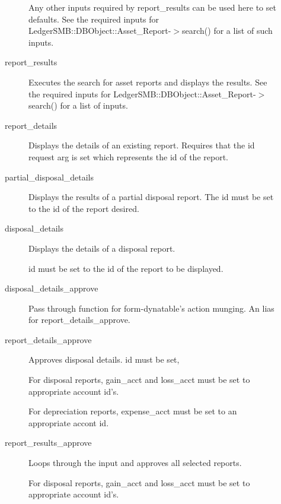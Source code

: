 \begin{description}
\begin{description}
Any other inputs required by
report\_results can be used here to set defaults.  See the required inputs for
LedgerSMB::DBObject::Asset\_Report-$>$search() for a list of such inputs.


\item[{report\_results}] \mbox{}

Executes the search for asset reports and displays the results.  See the 
required inputs for LedgerSMB::DBObject::Asset\_Report-$>$search() for a list of 
inputs.


\item[{report\_details}] \mbox{}

Displays the details of an existing report.  Requires that the id request arg is
set which represents the id of the report.


\item[{partial\_disposal\_details}] \mbox{}

Displays the results of a partial disposal report.  The id must be set to the 
id of the report desired.


\item[{disposal\_details}] \mbox{}

Displays the details of a disposal report.



id must be set to the id of the report to be displayed.


\item[{disposal\_details\_approve}] \mbox{}

Pass through function for form-dynatable's action munging.  An lias for 
report\_details\_approve.


\item[{report\_details\_approve}] \mbox{}

Approves disposal details.  id must be set,



For disposal reports, gain\_acct and loss\_acct must be set to appropriate 
account id's.



For depreciation reports, expense\_acct must be set to an appropriate accont id.


\item[{report\_results\_approve}] \mbox{}

Loops through the input and approves all selected reports.



For disposal reports, gain\_acct and loss\_acct must be set to appropriate 
account id's.




\end{description}
\end{description}
